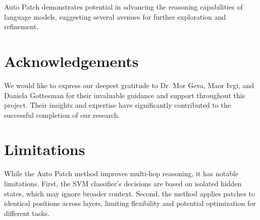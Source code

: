 \documentclass[11pt]{article}
\begin{document}
Auto Patch demonstrates potential in advancing the reasoning capabilities of language models, suggesting several avenues for further exploration and refinement.


\section*{Acknowledgements}

We would like to express our deepest gratitude to Dr. Mor Geva, Maor Ivgi, and Daniela Gottesman for their invaluable guidance and support throughout this project. Their insights and expertise have significantly contributed to the successful completion of our research.

\section*{Limitations}
While the Auto Patch method improves multi-hop reasoning, it has notable limitations. First, the SVM classifier's decisions are based on isolated hidden states, which may ignore broader context. Second, the method applies patches to identical positions across layers, limiting flexibility and potential optimization for different tasks.




\end{document}
